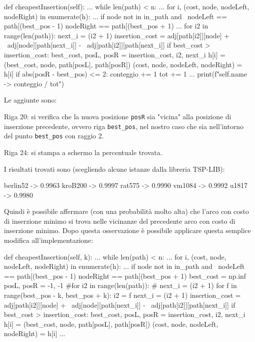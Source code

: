 \documentclass[a4paper,12pt]{report}
\begin{document}
\begin{python}
def cheapestInsertion(self):
  ...
  while len(path) < n:
    ...
    for i, (cost, node, nodeLeft, nodeRight) in enumerate(h):
      ...
      if node not in in_path and \
         nodeLeft == path[(best_pos - 1) %
         nodeRight == path[(best_pos + 1) %
        ...
        for i2 in range(len(path)):
          next_i = (i2 + 1) %
          insertion_cost = adj[path[i2]][node] + \
                           adj[node][path[next_i]] - \
                           adj[path[i2]][path[next_i]]
          if best_cost > insertion_cost:
            best_cost, posL, posR = insertion_cost, i2, next_i
        h[i] = (best_cost, node, path[posL], path[posR])
        (cost, node, nodeLeft, nodeRight) = h[i]
        if abs(posR - best_pos) <= 2:
          conteggio += 1
        tot += 1
  ...
  print(f"{self.name} -> {conteggio / tot}")
\end{python}
Le aggiunte sono:
\begin{legal}
  \item Riga 20: si verifica che la nuova posizione \lstinline!posR! sia "vicina" alla posizione di inserzione precedente, ovvero riga \lstinline!best_pos!, nel nostro caso che sia nell'intorno del punto \lstinline!best_pos! con raggio 2.
  \item Riga 24: si stampa a schermo la percentuale trovata.
\end{legal}
I risultati trovati sono (scegliendo alcune istanze dalla libreria TSP-LIB):
\begin{myverbatim}
berlin52 -> 0.9963
kroB200 -> 0.9997
rat575 -> 0.9990
vm1084 -> 0.9992
u1817 -> 0.9980
\end{myverbatim}
Quindi è possibile affermare (con una probabilità molto alta) che l'arco con costo di inserzione minimo si trova nelle vicinanze del precedente arco con costo di inserzione minimo. Dopo questa osservazione è possibile applicare questa semplice modifica all'implementazione:
\begin{python}
def cheapestInsertion(self, k):
  ...
  while len(path) < n:
    ...
    for i, (cost, node, nodeLeft, nodeRight) in enumerate(h):
      ...
      if node not in in_path and \
         nodeLeft == path[(best_pos - 1) %
         nodeRight == path[(best_pos + 1) %
        best_cost = np.inf
        posL, posR = -1, -1
        #for i2 in range(len(path)):
        #  next_i = (i2 + 1) %
        for f in range(best_pos - k, best_pos + k):
          i2 = f %
          next_i = (i2 + 1) %
          insertion_cost = adj[path[i2]][node] + \
                           adj[node][path[next_i]] - \
                           adj[path[i2]][path[next_i]]
          if best_cost > insertion_cost:
            best_cost, posL, posR = insertion_cost, i2, next_i
        h[i] = (best_cost, node, path[posL], path[posR])
        (cost, node, nodeLeft, nodeRight) = h[i]
        ...
\end{python}
\end{document}
